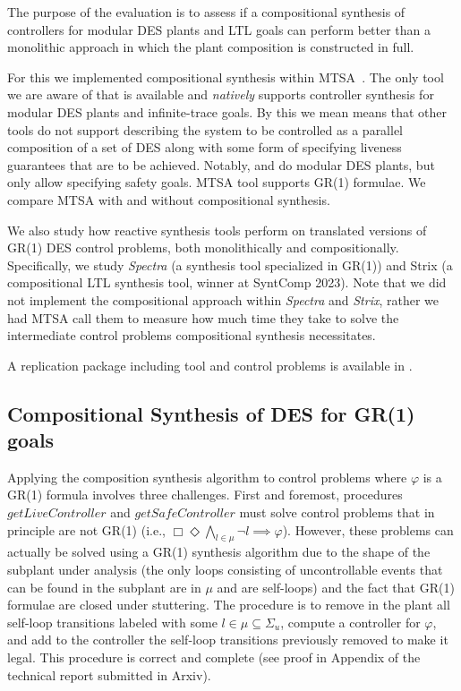 The purpose of the evaluation is to assess if a compositional  synthesis of controllers for modular DES plants and LTL goals can perform better than a monolithic approach in which the plant composition is constructed in full. 

For this we implemented compositional synthesis within MTSA~\cite{DIppolito2008}. The only tool we are aware of that is available and \textit{natively} supports controller synthesis for modular DES plants and infinite-trace goals.  By this we mean  means that other tools  do not support describing the system to be controlled as a parallel composition of a set of DES along with some form of specifying  liveness guarantees that are to be achieved. Notably, \cite{supremica} and \cite{eclipse} do modular DES plants, but only allow specifying safety goals. MTSA tool supports GR(1) formulae. We compare MTSA with and without compositional synthesis. 


We also study how reactive synthesis tools perform on translated versions of GR(1) DES control problems, both monolithically and compositionally. Specifically, we study  \textit{Spectra}\cite{maoz2021spectra} (a synthesis tool specialized in GR(1)) and Strix\cite{meyer_strix_2018} (a compositional LTL synthesis tool, winner at SyntComp 2023). Note that we did not implement the compositional approach within \textit{Spectra} and \textit{Strix}, rather we had MTSA call them to measure how much time they take to solve the intermediate control problems compositional synthesis necessitates. 

A replication package including tool and control problems is available in \cite{zenodo}.

\subsection{Compositional Synthesis of DES for  GR(1) goals}



Applying the composition synthesis algorithm 
to control problems where $\varphi$ is a GR(1) formula involves three challenges. 
First and foremost, procedures $getLiveController$ and $getSafeController$ must solve control problems that in principle are not GR(1) (i.e., $\Box\Diamond\bigwedge_{l\in \mu}\neg l \implies \varphi$). However, these problems can actually be solved using a GR(1) synthesis algorithm due to the shape of the subplant under analysis  (the only loops consisting of uncontrollable events that can be found in the subplant are in $\mu$ and are self-loops) and the fact that GR(1) formulae are closed under stuttering.
The procedure is to remove in the plant all self-loop transitions labeled with some $l \in \mu \subseteq \Sigma_u$, compute a controller for $\varphi$, and add to the controller the self-loop transitions previously removed to make it legal. This procedure is correct and complete (see proof in Appendix of the technical report submitted in Arxiv).

